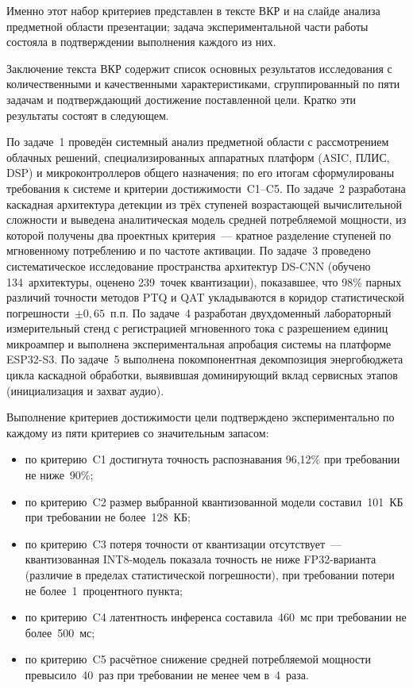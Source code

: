 Именно этот набор критериев представлен в тексте ВКР и на слайде
анализа предметной области презентации; задача экспериментальной
части работы состояла в подтверждении выполнения каждого из них.

Заключение текста ВКР содержит список основных результатов
исследования с количественными и качественными характеристиками,
сгруппированный по пяти задачам и подтверждающий достижение
поставленной цели. Кратко эти результаты состоят в следующем.

По задаче~1 проведён системный анализ предметной области с
рассмотрением облачных решений, специализированных аппаратных
платформ (ASIC, ПЛИС, DSP) и микроконтроллеров общего
назначения; по его итогам сформулированы требования к системе и
критерии достижимости~C1--C5. По задаче~2 разработана каскадная
архитектура детекции из трёх ступеней возрастающей вычислительной
сложности и выведена аналитическая модель средней потребляемой
мощности, из которой получены два проектных критерия~---
кратное разделение ступеней по мгновенному потреблению и по
частоте активации. По задаче~3 проведено систематическое
исследование пространства архитектур DS-CNN (обучено
134~архитектуры, оценено 239~точек квантизации), показавшее, что
98\% парных различий точности методов PTQ и QAT укладываются в
коридор статистической погрешности~$\pm 0{,}65$~п.п. По задаче~4
разработан двухдоменный лабораторный измерительный стенд с
регистрацией мгновенного тока с разрешением единиц микроампер и
выполнена экспериментальная апробация системы на платформе
ESP32-S3. По задаче~5 выполнена покомпонентная декомпозиция
энергобюджета цикла каскадной обработки, выявившая доминирующий
вклад сервисных этапов (инициализация и захват аудио).

Выполнение критериев достижимости цели подтверждено
экспериментально по каждому из пяти критериев со значительным
запасом:

\begin{itemize}
	\item по критерию~C1 достигнута точность распознавания
	      96,12\% при требовании не ниже~90\%;
	\item по критерию~C2 размер выбранной квантизованной
	      модели составил~101~КБ при требовании не более~128~КБ;
	\item по критерию~C3 потеря точности от квантизации
	      отсутствует~--- квантизованная INT8-модель показала
	      точность не ниже FP32-варианта (различие в пределах
	      статистической погрешности), при требовании потери не
	      более~1~процентного пункта;
	\item по критерию~C4 латентность инференса составила~460~мс
	      при требовании не более~500~мс;
	\item по критерию~C5 расчётное снижение средней потребляемой
	      мощности превысило~40~раз при требовании не менее
	      чем в~4~раза.
\end{itemize}

